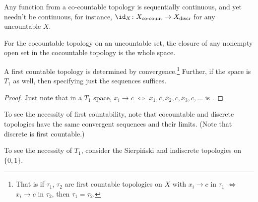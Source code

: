 	\begin{rmk}
		\begin{mylist}
			\item Any function from a co-countable topology is sequentially continuous, and yet needn't be continuous, for instance, $\id_X\colon X_\text{co-count}\to X_\text{discr}$ for any uncountable $X$.
			
			\item For the cocountable topology on an uncountable set, the closure of any nonempty open set in the cocountable topology is the whole space.
		\end{mylist}
	\end{rmk}
	
	\begin{cor}\label{COR: first countable T1 topologies via their sequences}
		A first countable topology is determined by convergence.\footnote{
			That is if $\tau_1$, $\tau_2$ are first countable topologies on $X$ with $x_i\to c$ in $\tau_1$ $\iff$ $x_i\to c$ in $\tau_2$, then $\tau_1 = \tau_2$.
		} Further, if the space is $T_1$ as well, then specifying just the \cgt sequences suffices.
	\end{cor}
	
	\begin{proof}
		Just note that in a \uline{$T_1$ space}, $x_i\to c$ $\iff$ $x_1, c, x_2, c, x_3, c, \ldots$ is \cgt.
	\end{proof}
	
	\begin{rmk}
		\begin{mylist}
			\item To see the necessity of first countability, note that cocountable and discrete topologies have the same convergent sequences and their limits. (Note that discrete is first countable.)
			
			\item To see the necessity of $T_1$, consider the Sierpiński and indiscrete topologies on $\{0, 1\}$.
		\end{mylist}
	\end{rmk}